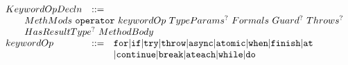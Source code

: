 \newcommand{\usrBreak}[3]{\ensuremath{{#1}\texttt{.break}\texttt{[}{#2}\texttt{]}^?~{#3}^?\texttt{;}}}
\newcommand{\libBreak}[3]{\ensuremath{{#1}\texttt{.operator break}\texttt{[}{#2}\texttt{]}^?\texttt{(}{#3}^?\texttt{);}}}

\newcommand{\usrAteach}[5]{\ensuremath{{#1}\texttt{.ateach}\texttt{[}{#2}\texttt{]}^?\texttt{(}({#3}\texttt{~in})^?~{#4}\texttt{)~}{#5}}}
\newcommand{\libAteach}[5]{\ensuremath{{#1}\texttt{.operator~ateach}\texttt{[}{#2}\texttt{]}^?\texttt{(}{#4}\texttt{,}~\texttt{(}{#3}^?\texttt{)}~\texttt{=>}~{#5}\texttt{);}}}

\newcommand{\usrWhile}[4]{\ensuremath{{#1}\texttt{.while}\texttt{[}{#2}\texttt{]}^?\texttt{(}{#3}\texttt{)~}{#4}}}
\newcommand{\libWhile}[4]{\ensuremath{{#1}\texttt{.operator~while}\texttt{[}{#2}\texttt{]}^?\texttt{(}%
    {#3}\texttt{,}~%
    \texttt{()=>}~{#4}\texttt{);}}}

\newcommand{\usrDo}[4]{\ensuremath{{#1}\texttt{.do}\texttt{[}{#2}\texttt{]}^?~{#3}\texttt{~while~(}{#4}\texttt{);}}}
\newcommand{\libDo}[4]{\ensuremath{{#1}\texttt{.operator~do}\texttt{[}{#2}\texttt{]}^?\texttt{(}%
    \texttt{()=>}~{#3}\texttt{,}~%
    {#4}\texttt{);}}}


$$
\begin{array}{lcl}
  KeywordOpDecln & ::= &
  \\
  \multicolumn{3}{l}{\qquad
  MethMods\ \mathtt{operator}\ keywordOp\ TypeParams^?\ Formals\ Guard^?\ Throws^?
  }\\
  \multicolumn{3}{l}{\qquad
  HasResultType^?\ MethodBody
  }\\
  keywordOp & ::= &
      \mathtt{for}
    | \mathtt{if}
    | \mathtt{try}
    | \mathtt{throw}
    | \mathtt{async}
    | \mathtt{atomic}
    | \mathtt{when}
    | \mathtt{finish}
    | \mathtt{at}
  \\ &&
    | \mathtt{continue}
    | \mathtt{break}
    | \mathtt{ateach}
    | \mathtt{while}
    | \mathtt{do}
\end{array}
$$


